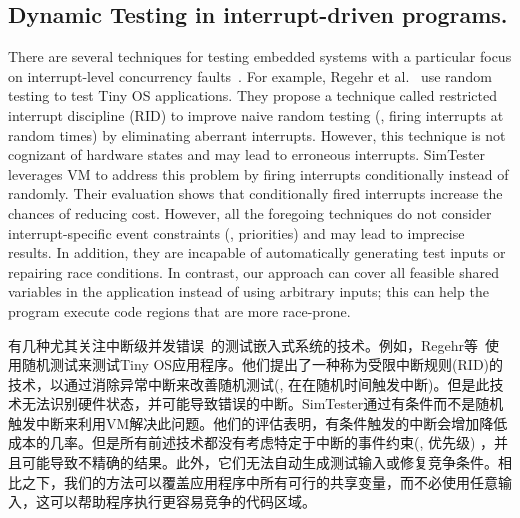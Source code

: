 \subsection{Dynamic Testing in interrupt-driven programs.}
There are several techniques for testing embedded
systems with a particular focus on interrupt-level 
concurrency faults~\cite{Regehr05, yu2012simtester, lai2008inter,
AST10Higashi}. For example, Regehr et
al.~\cite{Regehr05} use random testing to test Tiny OS applications.  
They propose a technique called restricted interrupt discipline (RID)
to improve naive random testing (\ie, firing
interrupts at random times) by eliminating aberrant
interrupts. However, this technique
is not cognizant of hardware states and may lead to 
erroneous interrupts.  SimTester \cite{yu2012simtester} leverages VM to address
this problem by firing interrupts conditionally 
instead of randomly. Their
evaluation shows that conditionally fired
interrupts increase the chances of reducing cost.  
However, all the foregoing techniques do not
consider interrupt-specific event constraints
(\eg, priorities) and may lead to imprecise results.
In addition, they are incapable of
automatically generating test inputs or repairing race conditions.
In contrast, our approach can cover all
feasible shared variables in the application instead of
using arbitrary inputs; this can help the program
execute code regions that are more race-prone.

有几种尤其关注中断级并发错误~\cite{Regehr05, yu2012simtester, lai2008inter,AST10Higashi}的测试嵌入式系统的技术。例如，Regehr等~\cite{Regehr05}使用随机测试来测试Tiny OS应用程序。他们提出了一种称为受限中断规则(RID)的技术，以通过消除异常中断来改善随机测试(\ie, 在在随机时间触发中断)。但是此技术无法识别硬件状态，并可能导致错误的中断。SimTester\cite{yu2012simtester}通过有条件而不是随机触发中断来利用VM解决此问题。他们的评估表明，有条件触发的中断会增加降低成本的几率。但是所有前述技术都没有考虑特定于中断的事件约束(\eg, 优先级) ，并且可能导致不精确的结果。此外，它们无法自动生成测试输入或修复竞争条件。相比之下，我们的方法可以覆盖应用程序中所有可行的共享变量，而不必使用任意输入，这可以帮助程序执行更容易竞争的代码区域。

